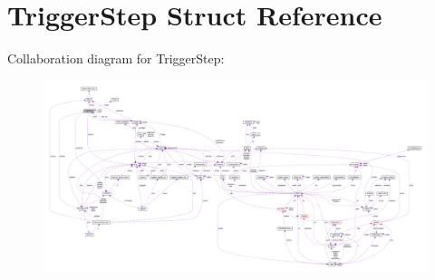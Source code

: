 \hypertarget{struct_trigger_step}{\section{Trigger\-Step Struct Reference}
\label{struct_trigger_step}
}


Collaboration diagram for Trigger\-Step\-:\nopagebreak
\begin{figure}[H]
\begin{center}
\leavevmode
\includegraphics[width=350pt]{struct_trigger_step__coll__graph}
\end{center}
\end{figure}
